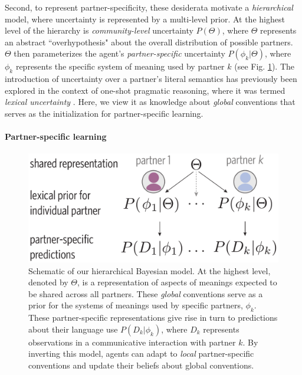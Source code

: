 Second, to represent partner-specificity, these desiderata motivate a \emph{hierarchical} model, where uncertainty is represented by a multi-level prior. 
At the highest level of the hierarchy is \emph{community-level} uncertainty $P(\Theta)$, where $\Theta$ represents an abstract ``overhypothesis" about the overall distribution of possible partners. 
$\Theta$ then parameterizes the agent's \emph{partner-specific} uncertainty $P(\phi_{k} | \Theta)$, where $\phi_k$ represents the specific system of meaning used by partner $k$ (see Fig. \ref{fig:model_schematic}). 
The introduction of uncertainty over a partner's literal semantics has previously been explored in the context of one-shot pragmatic reasoning, where it was termed \emph{lexical uncertainty} \cite{bergen_pragmatic_2016}. 
Here, we view it as knowledge about \emph{global} conventions that serves as the initialization for partner-specific learning.

\paragraph{Partner-specific learning}

\begin{figure}[t!]
\includegraphics[scale=0.4]{./figures/task1_model.pdf}
\vspace{.5em}
\caption{Schematic of our hierarchical Bayesian model. At the highest level, denoted by $\Theta$, is a representation of aspects of meanings expected to be shared across all partners. These \emph{global} conventions serve as a prior for the systems of meanings used by specific partners, $\phi_k$. These partner-specific representations give rise in turn to predictions about their language use $P(D_k|\phi_k)$, where $D_k$ represents observations in a communicative interaction with partner $k$. By inverting this model, agents can adapt to \emph{local} partner-specific conventions and update their beliefs about global conventions.}
\label{fig:model_schematic}
\end{figure}

